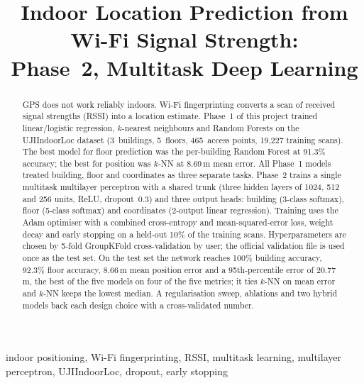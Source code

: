 \documentclass[conference]{IEEEtran}
\begin{document}
\title{Indoor Location Prediction from Wi-Fi Signal Strength:\\
Phase~2, Multitask Deep Learning}

\author{
}

\maketitle

\begin{abstract}
GPS does not work reliably indoors. Wi-Fi fingerprinting converts a scan of received signal
strengths (RSSI) into a location estimate. Phase~1 of this project trained linear/logistic
regression, $k$-nearest neighbours and Random Forests on the UJIIndoorLoc dataset (3~buildings,
5~floors, 465~access points, 19{,}227 training scans). The best model for floor prediction was the
per-building Random Forest at 91.3\% accuracy; the best for position was $k$-NN at 8.69\,m mean
error. All Phase~1 models treated building, floor and coordinates as three separate tasks.
Phase~2 trains a single multitask multilayer perceptron with a shared trunk (three hidden layers of
1024, 512 and 256 units, ReLU, dropout~0.3) and three output heads: building (3-class softmax),
floor (5-class softmax) and coordinates (2-output linear regression). Training uses the Adam
optimiser with a combined cross-entropy and mean-squared-error loss, weight decay and early
stopping on a held-out 10\% of the training scans. Hyperparameters are chosen by 5-fold
GroupKFold cross-validation by user; the official validation file is used once as the test set.
On the test set the network reaches 100\% building accuracy, 92.3\% floor accuracy, 8.66\,m mean
position error and a 95th-percentile error of 20.77\,m, the best of the five models on four of the
five metrics; it ties $k$-NN on mean error and $k$-NN keeps the lowest median. A regularisation
sweep, ablations and two hybrid models back each design choice with a cross-validated number.
\end{abstract}

\begin{IEEEkeywords}
indoor positioning, Wi-Fi fingerprinting, RSSI, multitask learning, multilayer perceptron,
UJIIndoorLoc, dropout, early stopping
\end{IEEEkeywords}
\end{document}
